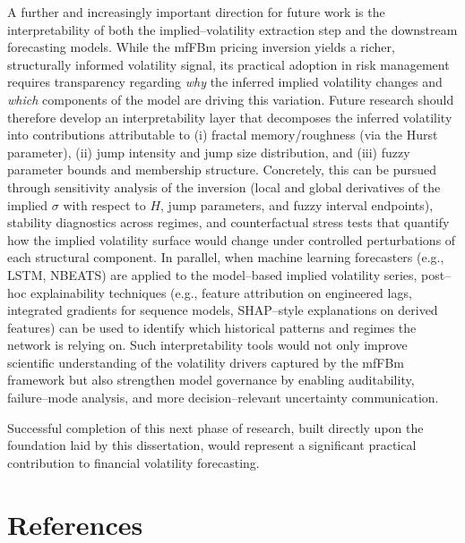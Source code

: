 \documentclass[12pt,a4paper]{report}
\numberwithin{equation}{section}
\begin{document}
A further and increasingly important direction for future work is the interpretability of both the implied--volatility extraction step and the downstream forecasting models. While the mfFBm pricing inversion yields a richer, structurally informed volatility signal, its practical adoption in risk management requires transparency regarding \emph{why} the inferred implied volatility changes and \emph{which} components of the model are driving this variation. Future research should therefore develop an interpretability layer that decomposes the inferred volatility into contributions attributable to (i) fractal memory/roughness (via the Hurst parameter), (ii) jump intensity and jump size distribution, and (iii) fuzzy parameter bounds and membership structure. Concretely, this can be pursued through sensitivity analysis of the inversion (local and global derivatives of the implied $\sigma$ with respect to $H$, jump parameters, and fuzzy interval endpoints), stability diagnostics across regimes, and counterfactual stress tests that quantify how the implied volatility surface would change under controlled perturbations of each structural component. In parallel, when machine learning forecasters (e.g., LSTM, NBEATS) are applied to the model--based implied volatility series, post--hoc explainability techniques (e.g., feature attribution on engineered lags, integrated gradients for sequence models, SHAP--style explanations on derived features) can be used to identify which historical patterns and regimes the network is relying on. Such interpretability tools would not only improve scientific understanding of the volatility drivers captured by the mfFBm framework but also strengthen model governance by enabling auditability, failure--mode analysis, and more decision--relevant uncertainty communication.

Successful completion of this next phase of research, built directly
upon the foundation laid by this dissertation, would represent a
significant practical contribution to financial volatility forecasting.

\hypertarget{references}{%
\chapter{\texorpdfstring{\textbf{References}}{References}}\label{references}}


\printbibliography[heading=none, notcategory=ownpubs]
\end{document}
